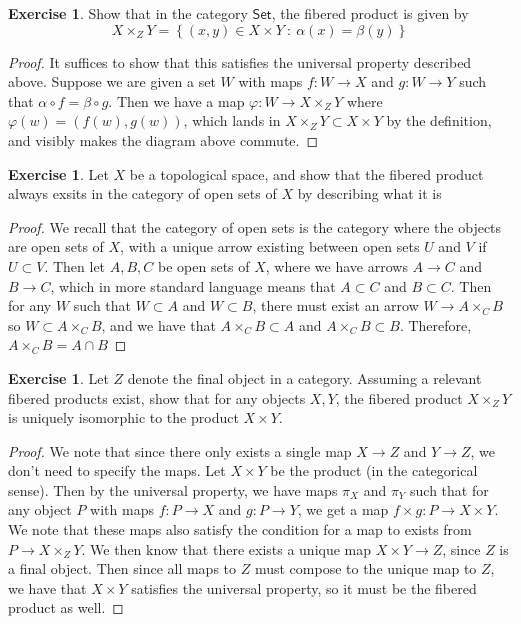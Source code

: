 \documentclass[psamsfonts]{amsart}
\theoremstyle{definition}
\newtheorem{exer}[thm]{Exercise}
\theoremstyle{remark}
\newcommand{\set}[1]{\left\lbrace #1 \right\rbrace}
\begin{document}
%
\begin{exer}
Show that in the category $\mathsf{Set}$, the fibered product is given by 
$$X \times_Z Y = \set{(x,y) \in X \times Y ~:~ \alpha(x) = \beta(y)} $$
\end{exer}
%
\begin{proof}
It suffices to show that this satisfies the universal property described above. Suppose we are given a set $W$ with maps $f: W \to X$ and $g: W \to Y$ such that $\alpha \circ f = \beta \circ g$. Then we have a map $\varphi: W \to X\times_Z Y$ where $\varphi(w) = (f(w),g(w))$, which lands in $X \times_Z Y \subset X \times Y$ by the definition, and visibly makes the diagram above commute.
\end{proof}
%
\begin{exer}
Let $X$ be a topological space, and show that the fibered product always exsits in the category of open sets of $X$ by describing what it is
\end{exer}
%
\begin{proof}
We recall that the category of open sets is the category where the objects are open sets of $X$, with a unique arrow existing between open sets $U$ and $V$ if $U \subset V$. Then let $A,B,C$ be open sets of $X$, where we have arrows $A \to C$ and $B \to C$, which in more standard language means that $A \subset C$ and $B \subset C$. Then for any $W$ such that $W \subset A$ and $W \subset B$, there must exist an arrow $W \to A \times_C B$ so $W \subset A \times_C B$, and we have that $A \times_C B \subset A$ and $A \times_C B \subset B$. Therefore, $A \times_C B = A \cap B$
\end{proof}
%
\begin{exer}
Let $Z$ denote the final object in a category. Assuming a relevant fibered products exist, show that for any objects $X,Y$, the fibered product $X \times_Z Y$ is uniquely isomorphic to the product $X \times Y$.
\end{exer}
%
\begin{proof}
We note that since there only exists a single map $X \to Z$ and $Y \to Z$, we don't need to specify the maps. Let $X \times Y$ be the product (in the categorical sense). Then by the universal property, we have maps $\pi_X$ and $\pi_Y$ such that for any object $P$ with maps $f: P \to X$ and $g: P \to Y$, we get a map $f \times g: P \to X \times Y$. We note that these maps also satisfy the condition for a map to exists from $P \to X \times_Z Y$. We then know that there exists a unique map $X \times Y \to Z$, since $Z$ is a final object. Then since all maps to $Z$ must compose to the unique map to $Z$, we have that $X \times Y$ satisfies the universal property, so it must be the fibered product as well.
\end{proof}
\end{document}
